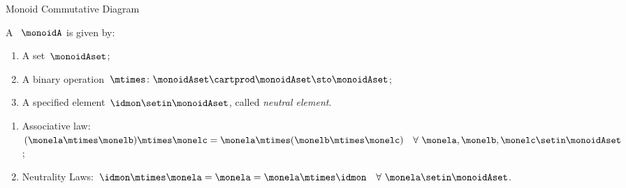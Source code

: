 \begin{marginfigure}
    \centering
    \caption{Monoid Commutative Diagram}
    \label{fig:monoid-commutative-diagram}
\end{marginfigure}
\begin{ctdefinition}[Monoid]
    \label{def:monoid}
    A ~$\monoidA$ is given by:
    \begin{body}
        \constit
        \begin{enumerate}
            \item A set~$\monoidAset$;
            \item A binary operation~$\mtimes \colon \monoidAset \cartprod \monoidAset \sto \monoidAset$;
            \item A specified element~$\idmon \setin \monoidAset$, called \emph{neutral element}.
        \end{enumerate}
        \condit
        \begin{enumerate}
            \item Associative law:~$(\monela\mtimes  \monelb)\mtimes  \monelc=
                      \monela\mtimes  (\monelb\mtimes  \monelc) \quad  \forall \  \monela, \monelb, \monelc \setin \monoidAset$;
            \item Neutrality Laws:~$\idmon\mtimes \monela=\monela=\monela\mtimes  \idmon \quad  \forall \ \monela \setin \monoidAset $.
        \end{enumerate}
    \end{body}
\end{ctdefinition}




